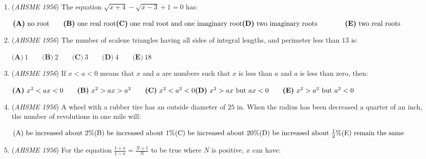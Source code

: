 \begin{enumerate}
 $\textbf{(A)}\ \text{no value of }x \qquad \textbf{(B)}\ \text{all values of }x \qquad \textbf{(C)}\ x = 0\text{ only} \\ \textbf{(D)}\ \text{all integral values of }x\text{ only} \qquad \textbf{(E)}\ \text{all rational values of }x\text{ only}$


	\item (\textit{AHSME 1956}) The equation $\sqrt {x + 4} - \sqrt {x - 3} + 1 = 0$ has: 


 $\textbf{(A)}\ \text{no root} \qquad  \textbf{(B)}\ \text{one real root} \\ \textbf{(C)}\ \text{one real root and one imaginary root} \\ \textbf{(D)}\ \text{two imaginary roots} \qquad \qquad\textbf{(E)}\ \text{two real roots}$


	\item (\textit{AHSME 1956}) The number of scalene triangles having all sides of integral lengths, and perimeter less than $13$ is: 


 $\textbf{(A)}\ 1 \qquad\textbf{(B)}\ 2 \qquad\textbf{(C)}\ 3 \qquad\textbf{(D)}\ 4 \qquad\textbf{(E)}\ 18$


	\item (\textit{AHSME 1956}) If $x < a < 0$ means that $x$ and $a$ are numbers such that $x$ is less than $a$ and $a$ is less than zero, then: 


 $\textbf{(A)}\ x^2 < ax < 0 \qquad \textbf{(B)}\ x^2 > ax > a^2 \qquad \textbf{(C)}\ x^2 < a^2 < 0 \\ \textbf{(D)}\ x^2 > ax\text{ but }ax < 0 \qquad \textbf{(E)}\ x^2 > a^2\text{ but }a^2 < 0$


	\item (\textit{AHSME 1956}) A wheel with a rubber tire has an outside diameter of $25$ in. 
When the radius has been decreased a quarter of an inch, the number of revolutions in one mile will: 


 $\text{(A)}\ \text{be increased about }2\% \qquad \\ \text{(B)}\ \text{be increased about }1\%  \\ \text{(C)}\ \text{be increased about }20\%\qquad \\ \text{(D)}\ \text{be increased about }\frac{1}{2}\%\qquad \\ \text{(E)}\ \text{remain the same}$


	\item (\textit{AHSME 1956}) For the equation $\frac {1 + x}{1 - x} = \frac {N + 1}{N}$ to be true where $N$ is positive, $x$ can have: 



\end{enumerate}
